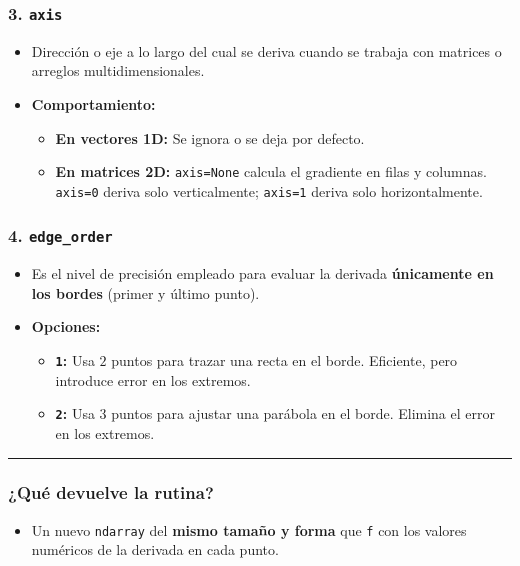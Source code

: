 \documentclass[12pt]{article}
\begin{document}
\begin{cajaflex}
\subsubsection*{\textcolor{teal!70!black}{3. \texttt{axis} }}
\begin{itemize}
    \item Dirección o eje a lo largo del cual se deriva cuando se trabaja con matrices o arreglos multidimensionales.
    \item \textbf{Comportamiento:}
    \begin{itemize}
        \item \textbf{En vectores 1D:} Se ignora o se deja por defecto.
        \item \textbf{En matrices 2D:} \texttt{axis=None} calcula el gradiente en filas y columnas. \texttt{axis=0} deriva solo verticalmente; \texttt{axis=1} deriva solo horizontalmente.
    \end{itemize}
\end{itemize}

\subsubsection*{\textcolor{teal!70!black}{4. \texttt{edge\_order} }}
\begin{itemize}
    \item Es el nivel de precisión empleado para evaluar la derivada \textbf{únicamente en los bordes} (primer y último punto).
    \item \textbf{Opciones:}
    \begin{itemize}
        \item \textbf{\texttt{1}:} Usa $2$ puntos para trazar una recta en el borde. 
        Eficiente, pero introduce error en los extremos.
        \item \textbf{\texttt{2}:} Usa $3$ puntos para ajustar una parábola en el 
        borde. Elimina el error en los extremos.
    \end{itemize}
\end{itemize}

\textcolor{teal!60!black}{\rule{\linewidth}{0.8pt}}

\subsubsection*{\textcolor{teal!70!black}{¿Qué devuelve la rutina?}}
\begin{itemize}
    \item Un nuevo \texttt{ndarray} del \textbf{mismo tamaño y forma} que 
    \texttt{f} con los valores numéricos de la derivada en cada punto. 
\end{itemize}

\end{cajaflex}
\end{document}
